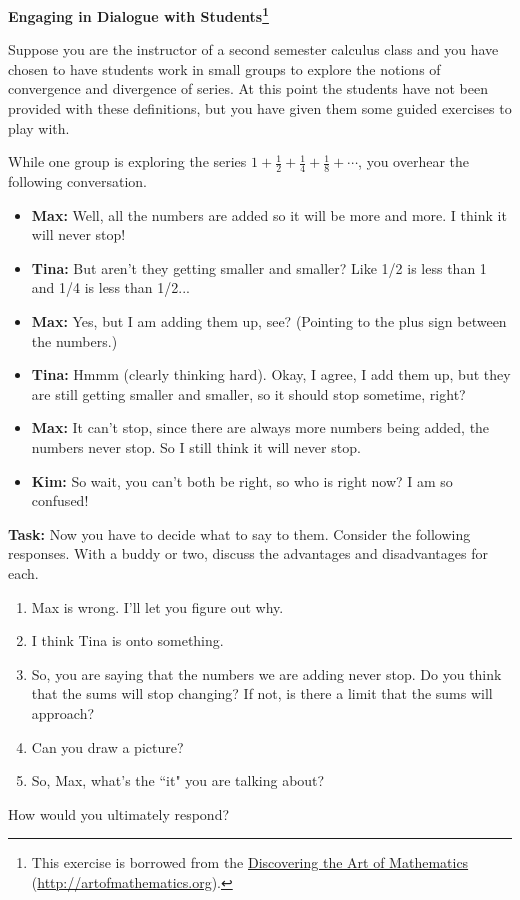 \documentclass[12pt]{article}
\newcommand{\blankline}{\pagebreak[2]\vspace{.5\baselineskip}}
\begin{document}
\begin{center}

{\Large\bf Engaging in Dialogue with Students\footnote{This exercise is borrowed from the \href{http://www.artofmathematics.org/}{Discovering the Art of Mathematics} (\url{http://artofmathematics.org}).}} 

\end{center}

\setlength{\parindent}{0pt}
\setlength{\fboxsep}{10pt}

Suppose you are the instructor of a second semester calculus class and you have chosen to have students work in small groups to explore the notions of convergence and divergence of series.  At this point the students have not been provided with these definitions, but you have given them some guided exercises to play with.

\blankline

While one group is exploring the series $1+\frac{1}{2}+\frac{1}{4}+\frac{1}{8}+\cdots$, you overhear the following conversation.

\begin{itemize}
\item[] \textbf{Max:} Well, all the numbers are added so it will be more and more. I think it will never stop!
\item[] \textbf{Tina:} But aren't they getting smaller and smaller? Like 1/2 is less than 1 and 1/4 is less than 1/2...
\item[] \textbf{Max:} Yes, but I am adding them up, see? (Pointing to the plus sign between the numbers.)
\item[] \textbf{Tina:} Hmmm (clearly thinking hard). Okay, I agree, I add them up, but they are still getting smaller and smaller, so it should stop sometime, right?
\item[] \textbf{Max:} It can't stop, since there are always more numbers being added, the numbers never stop. So I still think it will never stop.
\item[] \textbf{Kim:} So wait, you can't both be right, so who is right now? I am so confused!
\end{itemize}

\textbf{Task:}  Now you have to decide what to say to them.  Consider the following responses.  With a buddy or two, discuss the advantages and disadvantages for each.

\begin{enumerate}
\item Max is wrong.  I'll let you figure out why.
\item I think Tina is onto something.
\item So, you are saying that the numbers we are adding never stop.  Do you think that the sums will stop changing?  If not, is there a limit that the sums will approach?
\item Can you draw a picture?
\item So, Max, what's the ``it" you are talking about?
\end{enumerate}

How would you ultimately respond?
\end{document}
